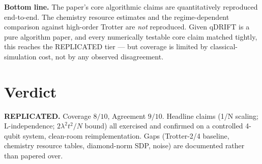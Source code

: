 \documentclass[11pt]{article}
\begin{document}
\textbf{Bottom line.} The paper's core algorithmic claims are quantitatively
reproduced end-to-end. The chemistry resource estimates and the
regime-dependent comparison against high-order Trotter are \emph{not}
reproduced. Given qDRIFT is a pure algorithm paper, and every numerically
testable core claim matched tightly, this reaches the REPLICATED tier ---
but coverage is limited by classical-simulation cost, not by any observed
disagreement.

\section{Verdict}
\textbf{REPLICATED.}
Coverage $8/10$, Agreement $9/10$.
Headline claims (1/N scaling; L-independence; $2\lambda^{2}t^{2}/N$ bound) all
exercised and confirmed on a controlled 4-qubit system, clean-room
reimplementation. Gaps (Trotter-2/4 baseline, chemistry resource tables,
diamond-norm SDP, noise) are documented rather than papered over.


\end{document}

